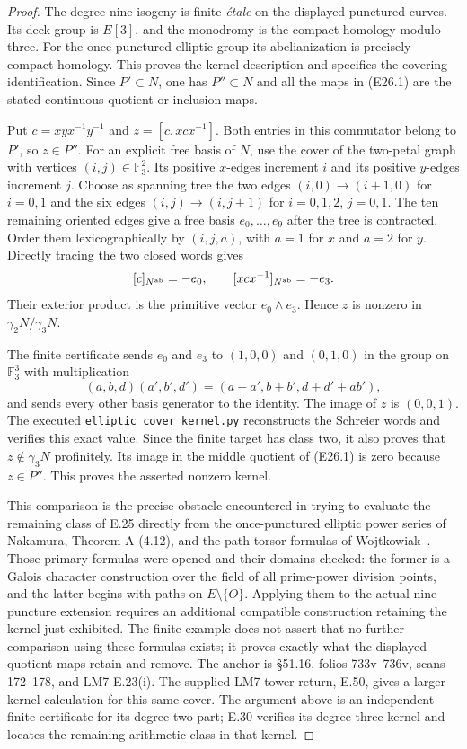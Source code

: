 \begin{proof}
The degree-nine isogeny is finite \emph{\'etale} on the
displayed punctured curves. Its deck group is $E[3]$,
and the monodromy is the compact homology modulo three.
For the once-punctured elliptic group its abelianization
is precisely compact homology. This proves the kernel
description and specifies the covering identification.
Since $P'\subset N$, one has $P''\subset N$ and all
the maps in (E26.1) are the stated continuous quotient
or inclusion maps.

Put $c=xyx^{-1}y^{-1}$ and
$z=[c,xcx^{-1}]$. Both entries in this commutator
belong to $P'$, so $z\in P''$.
For an explicit free basis of $N$, use the cover of the
two-petal graph with vertices $(i,j)\in\mathbb F_3^2$.
Its positive $x$-edges increment $i$ and its positive
$y$-edges increment $j$. Choose as spanning tree the
two edges $(i,0)\to(i+1,0)$ for $i=0,1$ and the six
edges $(i,j)\to(i,j+1)$ for $i=0,1,2$, $j=0,1$.
The ten remaining oriented edges give a free basis
$e_0,\ldots,e_9$ after the tree is contracted.
Order them lexicographically by $(i,j,a)$, with
$a=1$ for $x$ and $a=2$ for $y$. Directly tracing the
two closed words gives
\[
 [c]_{N^{\rm ab}}=-e_0,\qquad
 [xcx^{-1}]_{N^{\rm ab}}=-e_3.
\]
Their exterior product is the primitive vector
$e_0\wedge e_3$. Hence $z$ is nonzero in
$\gamma_2N/\gamma_3N$.

The finite certificate sends $e_0$ and $e_3$ to
$(1,0,0)$ and $(0,1,0)$ in the group on
$\mathbb F_3^3$ with multiplication
\[
 (a,b,d)(a',b',d')=(a+a',b+b',d+d'+ab'),
\]
and sends every other basis generator to the identity.
The image of $z$ is $(0,0,1)$. The executed
\texttt{elliptic\_cover\_kernel.py} reconstructs the
Schreier words and verifies this exact value. Since
the finite target has class two, it also proves that
$z\notin\gamma_3N$ profinitely. Its image in the
middle quotient of (E26.1) is zero because $z\in P''$.
This proves the asserted nonzero kernel.

This comparison is the precise obstacle encountered
in trying to evaluate the remaining class of E.25
directly from the once-punctured elliptic power series
of Nakamura, Theorem A (4.12), and the path-torsor
formulas of Wojtkowiak~\cite{Nakamura1995Elliptic,Wojtkowiak2004Paths}.
Those primary formulas were opened and their domains
checked: the former is a Galois character construction
over the field of all prime-power division points,
and the latter begins with paths on
$E\setminus\{O\}$. Applying them to the actual
nine-puncture extension requires an additional
compatible construction retaining the kernel just
exhibited. The finite example does not assert that
no further comparison using these formulas exists;
it proves exactly what the displayed quotient maps
retain and remove. The anchor is \S51.16, folios
733v--736v, scans 172--178, and LM7-E.23(i).
The supplied LM7 tower return, E.50, gives a larger
kernel calculation for this same cover. The argument
above is an independent finite certificate for its
degree-two part; E.30 verifies its degree-three kernel
and locates the remaining arithmetic class in that kernel.
\end{proof}
